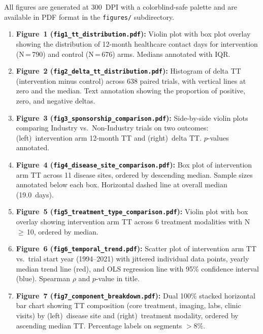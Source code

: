 \documentclass[11pt,a4paper]{article}
\begin{document}
All figures are generated at 300~DPI with a colorblind-safe palette and are available in PDF format in the \texttt{figures/} subdirectory.

\begin{enumerate}
    \item \textbf{Figure~1 (\texttt{fig1\_tt\_distribution.pdf}):} Violin plot with box plot overlay showing the distribution of 12-month healthcare contact days for intervention (N\,=\,790) and control (N\,=\,676) arms. Medians annotated with IQR.

    \item \textbf{Figure~2 (\texttt{fig2\_delta\_tt\_distribution.pdf}):} Histogram of delta TT (intervention minus control) across 638 paired trials, with vertical lines at zero and the median. Text annotation showing the proportion of positive, zero, and negative deltas.

    \item \textbf{Figure~3 (\texttt{fig3\_sponsorship\_comparison.pdf}):} Side-by-side violin plots comparing Industry vs.\ Non-Industry trials on two outcomes: (left)~intervention arm 12-month TT and (right)~delta TT. $p$-values annotated.

    \item \textbf{Figure~4 (\texttt{fig4\_disease\_site\_comparison.pdf}):} Box plot of intervention arm TT across 11 disease sites, ordered by descending median. Sample sizes annotated below each box. Horizontal dashed line at overall median (19.0~days).

    \item \textbf{Figure~5 (\texttt{fig5\_treatment\_type\_comparison.pdf}):} Violin plot with box overlay showing intervention arm TT across 6 treatment modalities with N\,$\geq$\,10, ordered by median.

    \item \textbf{Figure~6 (\texttt{fig6\_temporal\_trend.pdf}):} Scatter plot of intervention arm TT vs.\ trial start year (1994--2021) with jittered individual data points, yearly median trend line (red), and OLS regression line with 95\% confidence interval (blue). Spearman $\rho$ and $p$-value in title.

    \item \textbf{Figure~7 (\texttt{fig7\_component\_breakdown.pdf}):} Dual 100\% stacked horizontal bar chart showing TT composition (core treatment, imaging, labs, clinic visits) by (left)~disease site and (right)~treatment modality, ordered by ascending median TT. Percentage labels on segments $>8\%$.


\end{enumerate}
\end{document}
